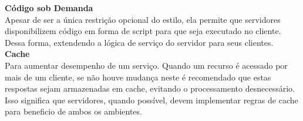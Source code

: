 \textbf{Código sob Demanda} \\

Apesar de ser a única restrição opcional do estilo, ela permite que servidores disponibilizem código em forma de script para que seja executado no cliente. Dessa forma, extendendo a lógica de serviço do servidor para seus clientes. \cite{Fielding2000} \\

\textbf{Cache} \\

Para aumentar desempenho de um serviço. Quando um recurso é acessado por mais de um cliente, se não houve mudança neste é recomendado que estas respostas sejam armazenadas em cache, evitando o processamento desnecessário. Isso significa que servidores, quando possível, devem implementar regras de cache para beneficio de ambos os ambientes. \cite{Fielding2000}
